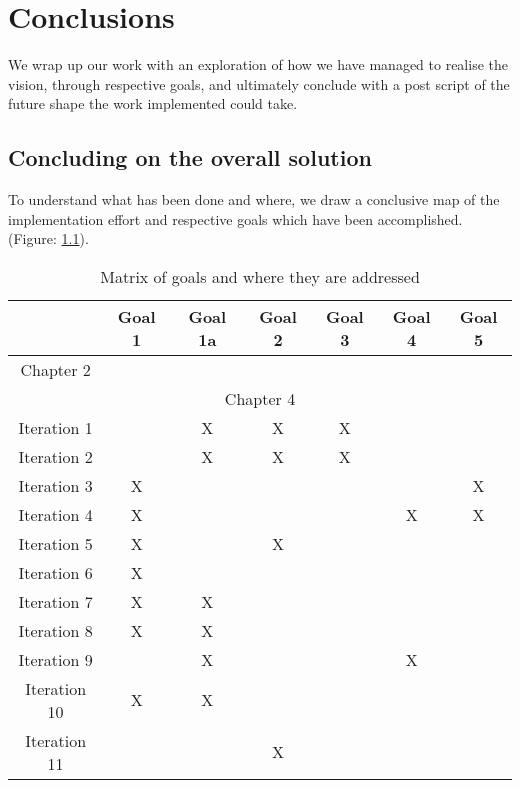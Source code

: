 \chapter{Conclusions}

We wrap up our work with an exploration of how we have managed to realise the vision, through respective goals, and ultimately conclude with a post script of the future shape the work implemented could take.

\section{Concluding on the overall solution}

To understand what has been done and where, we draw a conclusive map of the implementation effort and respective goals which have been accomplished. (Figure: \ref{table:matrixOfGoalsAndTheirImplementationEffort}). 

\begin{table}[h!]
\centering
\small
	\begin{tabular}{|c|c|c|c|c|c|c|}
		\hline 
		& Goal 1 & Goal 1a & Goal 2 & Goal 3 & Goal 4 & Goal 5 \\ 
		\hline 
		Chapter 2 &  &  &  &  &  &  \\ 
		\hline 
		\multicolumn{7}{|c|}{Chapter 4} \\ 
		\hline 
		Iteration 1 &  & X & X & X &  &  \\ 
		\hline 	
		Iteration 2 &  & X & X & X &  &  \\ 
		\hline 	
		Iteration 3 & X &  &  &  &  & X \\ 
		\hline 
		Iteration 4 & X &  &  &  & X & X \\ 
		\hline 
		Iteration 5 & X &  & X &  &  &  \\ 
		\hline 
		Iteration 6 & X &  &  &  &  &  \\ 
		\hline 
		Iteration 7 & X & X &  &  &  &  \\ 
		\hline 
		Iteration 8 & X & X &  &  &  &  \\ 
		\hline 
		Iteration 9 &  & X &  &  & X &  \\ 
		\hline 
		Iteration 10 & X & X &  &  &  &  \\ 
		\hline 
		Iteration 11 &  &  & X &  &  &  \\ 
		\hline 
	\end{tabular} 
	\caption{Matrix of goals and where they are addressed}
	\label{table:matrixOfGoalsAndTheirImplementationEffort}
\end{table}

